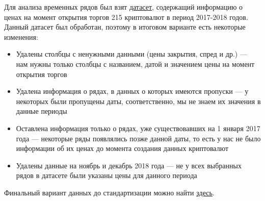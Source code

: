 Для анализа временных рядов был взят \href{https://www.kaggle.com/jessevent/all-crypto-currencies}{датасет}, содержащий информацию о ценах на момент открытия торгов 215 криптовалют в период 2017-2018 годов. Данный датасет был обработан, поэтому в итоговом варианте есть некоторые изменения:
\begin{itemize}
	\item Удалены столбцы с ненужными данными (цены закрытия, спред и др.) --- нам нужны только столбцы с названием, датой и значением цены на момент открытия торгов
	\item Удалена информация о рядах, в данных о которых имеются пропуски --- у некоторых были пропущены даты, соответственно, мы не знаем их значения в данные периоды
	\item Оставлена информация только о рядах, уже существовавших на 1 января 2017 года --- некоторые ряды появлялись позже данной даты, то есть у нас не было информации об их ценах до момента создания данных криптовалют
	\item Удалены данные на ноябрь и декабрь 2018 года --- не у всех выбранных рядов в датасете были указаны цены для данного периода
\end{itemize}


Финальный вариант данных до стандартизации можно найти \href{https://github.com/elizacc/CourseWork}{здесь}.